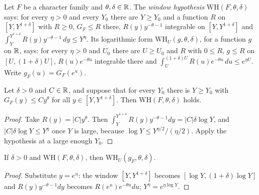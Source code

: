 \begin{definition}\label{an:windowhyp}
Let $F$ be a character family and $\theta,\delta\in\mathbb{R}$. The \emph{window
hypothesis} $\mathrm{WH}(F,\theta,\delta)$ says: for every $\eta>0$ and
every $Y_0$ there are $Y\ge Y_0$ and a function $R$ on
$[Y,Y^{1+\delta}]$ with $R\ge0$, $G_F\le R$ there, $R(y)y^{-\theta-1}$
integrable on $[Y,Y^{1+\delta}]$ and
$\int_Y^{Y^{1+\delta}}R(y)y^{-\theta-1}\,dy\le Y^{\eta}$.
Its logarithmic form $\mathrm{WH}_U(g,\theta,\delta)$, for a function $g$
on $\mathbb{R}$, says: for every $\eta>0$ and $U_0$ there are $U\ge U_0$ and $R$
with $0\le R$, $g\le R$ on $[U,(1+\delta)U]$, $R(u)e^{-\theta u}$
integrable there and $\int_U^{(1+\delta)U}R(u)e^{-\theta u}\,du\le
e^{\eta U}$. Write $g_F(u)=G_F(e^u)$.
\end{definition}

\begin{lemma}\label{an:windowhyp-rpow}
Let $\delta>0$ and $C\in\mathbb{R}$, and suppose that for every $Y_0$ there is
$Y\ge Y_0$ with $G_F(y)\le Cy^{\theta}$ for all $y\in[Y,Y^{1+\delta}]$.
Then $\mathrm{WH}(F,\theta,\delta)$ holds.
\end{lemma}
\begin{proof}
Take $R(y)=|C|y^{\theta}$. Then $\int_Y^{Y^{1+\delta}}R(y)y^{-\theta-1}dy
=|C|\delta\log Y$, and $|C|\delta\log Y\le Y^{\eta}$ once $Y$ is large,
because $\log Y\le Y^{\eta/2}/(\eta/2)$. Apply the hypothesis at a large
enough $Y_0$.
\end{proof}

\begin{lemma}\label{an:windowhypu}
If $\delta>0$ and $\mathrm{WH}(F,\theta,\delta)$, then
$\mathrm{WH}_U(g_F,\theta,\delta)$.
\end{lemma}
\begin{proof}
Substitute $y=e^u$: the window $[Y,Y^{1+\delta}]$ becomes
$[\log Y,(1+\delta)\log Y]$ and $R(y)y^{-\theta-1}dy$ becomes
$R(e^u)e^{-\theta u}du$; $Y^{\eta}=e^{\eta\log Y}$.
\end{proof}

